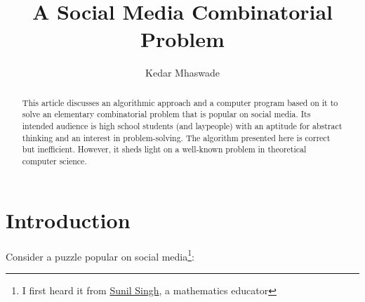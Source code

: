 \documentclass{resonance}
\begin{document}
\title{A Social Media Combinatorial Problem}
\author{Kedar Mhaswade}

\maketitle
\begin{abstract}
\noindent This article discusses an algorithmic approach and a computer program based on it to solve an elementary combinatorial problem that is popular on social media. Its intended audience is high school students (and laypeople) with an aptitude for abstract thinking and an interest in problem-solving. The algorithm presented here is correct but inefficient. However, it sheds light on a well-known problem in theoretical computer science.

\end{abstract}



\section{Introduction}
Consider a puzzle popular on social media\footnote{I first heard it from \href{https://sunilsingh-42118.medium.com/}{Sunil Singh}, a mathematics educator}:
\end{document}
